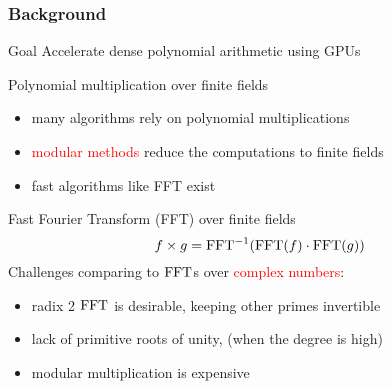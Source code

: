 
\begin{frame}
\frametitle{Background}
\begin{block}{Goal}
Accelerate dense polynomial arithmetic using GPUs   
\end{block}
\begin{block}{Polynomial multiplication over finite fields}
\begin{itemize}
\item many algorithms rely on polynomial multiplications
\item \textcolor{red}{modular methods} reduce the computations to finite fields
\item fast algorithms like FFT exist
\end{itemize}
\end{block}
\begin{block}{Fast Fourier Transform (FFT) over finite fields}
$$f \times g = \mathrm{FFT}^{-1} (\mathrm{FFT}(f) \cdot \mathrm{FFT}(g))$$
Challenges comparing to $\mathrm{FFT}$s over \textcolor{red}{complex numbers}:
\begin{itemize}
\item radix 2 $\mathrm{FFT}$ is desirable, keeping other primes invertible 
\item lack of primitive roots of unity, (when the degree is high)
\item modular multiplication is expensive
\end{itemize}
\end{block}
\end{frame}

